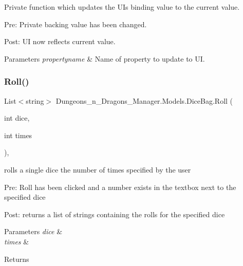 Private function which updates the UI\textquotesingle{}s binding value to the current value. 

Pre\+: Private backing value has been changed.

Post\+: UI now reflects current value. 


\begin{DoxyParams}{Parameters}
{\em propertyname} & Name of property to update to UI.\\
\hline
\end{DoxyParams}
\mbox{\label{class_dungeons__n___dragons___manager_1_1_models_1_1_dice_bag_a53f74f01ef6abae6b927331d7be8fd1e}} 
\subsubsection{\texorpdfstring{Roll()}{Roll()}}
{\footnotesize\ttfamily List$<$string$>$ Dungeons\+\_\+n\+\_\+\+Dragons\+\_\+\+Manager.\+Models.\+Dice\+Bag.\+Roll (\begin{DoxyParamCaption}\item[{int}]{dice,  }\item[{int}]{times }\end{DoxyParamCaption})\hspace{0.3cm}{\ttfamily [inline]}, {\ttfamily [private]}}



rolls a single dice the number of times specified by the user 

Pre\+: Roll has been clicked and a number exists in the textbox next to the specified dice

Post\+: returns a list of strings containing the rolls for the specified dice 


\begin{DoxyParams}{Parameters}
{\em dice} & \\
\hline
{\em times} & \\
\hline
\end{DoxyParams}
\begin{DoxyReturn}{Returns}

\end{DoxyReturn}
\mbox{\label{class_dungeons__n___dragons___manager_1_1_models_1_1_dice_bag_a1429fe1d9eb02bf0ad2604094da1edf6}} 
